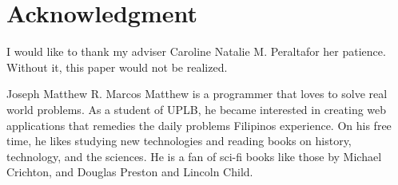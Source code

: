 \documentclass[journal]{./IEEE/IEEEtran}
\newcommand{\ADVISEE}{Joseph Matthew R. Marcos}
\newcommand{\ADVISER}{Caroline Natalie M. Peralta}
\begin{document}


\newpage
\section*{Acknowledgment}
I would like to thank my adviser \ADVISER for her patience. Without it, this paper would not be realized.
\begin{biography}{\ADVISEE}
    Matthew is a programmer that loves to solve real world problems. As a student of UPLB, he became interested in creating
    web applications that remedies the daily problems Filipinos experience. On his free time, he likes studying new
    technologies and reading books on history, technology, and the sciences. He is a fan of sci-fi books like those by
    Michael Crichton, and Douglas Preston and Lincoln Child.
\end{biography}


\newpage
% 



\newpage
\appendices
\end{document}

